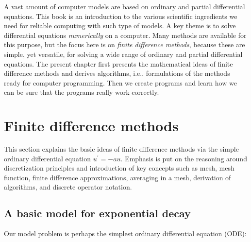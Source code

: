\documentclass[graybox,sectrefs,envcountresetchap,open=right,final]{svmonodo}
\begin{document}

A vast amount of computer models are based on ordinary and partial
differential equations. This book is an introduction to the
various scientific ingredients we need for reliable computing with such
type of models. A key theme is to solve differential equations
\emph{numerically} on a computer. Many methods are available for this purpose,
but the focus here is on \emph{finite difference methods}, because these
are simple, yet versatile, for solving a wide range of ordinary and
partial differential equations. The present chapter first presents the
mathematical ideas of finite difference methods and derives algorithms,
i.e., formulations of the methods ready for computer programming.
Then we create programs and learn how we can be sure that the programs
really work correctly.

\section{Finite difference methods}

\label{decay:basics}

This section explains the basic ideas of finite difference methods
via the simple ordinary differential equation $u^{\prime}=-au$.
Emphasis is put on the reasoning around discretization principles and
introduction of key concepts such as mesh, mesh function,
finite difference approximations, averaging in a mesh,
derivation of algorithms, and discrete operator notation.

\subsection{A basic model for exponential decay}
\label{decay:model}

 

Our model problem is perhaps the simplest ordinary differential
equation (ODE):
\end{document}
